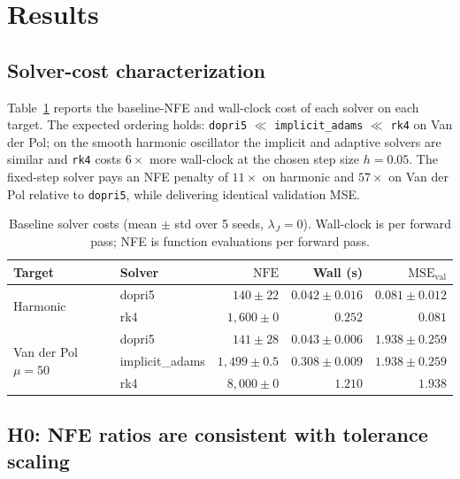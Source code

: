 \documentclass[11pt]{article}
\theoremstyle{plain}
\theoremstyle{definition}
\newcommand{\NFE}{\mathrm{NFE}}
\begin{document}
\section{Results}
\label{sec:results}

\subsection{Solver-cost characterization}
\label{sec:cost-baseline}

Table~\ref{tab:baseline-cost} reports the baseline-NFE and wall-clock cost of
each solver on each target. The expected ordering holds:
\texttt{dopri5} $\ll$ \texttt{implicit\_adams} $\ll$ \texttt{rk4} on Van der
Pol; on the smooth harmonic oscillator the implicit and adaptive solvers are
similar and \texttt{rk4} costs $6\times$ more wall-clock at the chosen step
size $h = 0.05$. The fixed-step solver pays an NFE penalty of $11\times$ on
harmonic and $57\times$ on Van der Pol relative to \texttt{dopri5}, while
delivering identical validation MSE.

\begin{table}[t]
\centering
\caption{Baseline solver costs (mean $\pm$ std over 5 seeds, $\lambda_J = 0$).
  Wall-clock is per forward pass; NFE is function evaluations per forward
  pass.}
\label{tab:baseline-cost}
\begin{tabular}{l l r r r}
\toprule
Target & Solver & $\NFE$ & Wall (s) & $\mathrm{MSE}_\text{val}$ \\
\midrule
\multirow{2}{*}{Harmonic} & dopri5 & $140 \pm 22$ & $0.042 \pm 0.016$ & $0.081 \pm 0.012$ \\
                          & rk4    & $1{,}600 \pm 0$ & $0.252$ & $0.081$ \\
\midrule
\multirow{3}{*}{Van der Pol $\mu{=}50$} & dopri5         & $141 \pm 28$ & $0.043 \pm 0.006$ & $1.938 \pm 0.259$ \\
                                       & implicit\_adams & $1{,}499 \pm 0.5$ & $0.308 \pm 0.009$ & $1.938 \pm 0.259$ \\
                                       & rk4             & $8{,}000 \pm 0$  & $1.210$ & $1.938$ \\
\bottomrule
\end{tabular}
\end{table}

\subsection{H0: NFE ratios are consistent with tolerance scaling}
\label{sec:h0}
\end{document}
